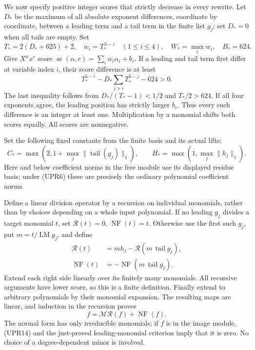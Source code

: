 We now specify positive integer scores that strictly decrease in
every rewrite.  Let \(D_*\) be the maximum of all absolute exponent
differences, coordinate by coordinate, between a leading term and
a tail term in the finite list \(g_j\); set \(D_*=0\) when all tails
are empty.  Set
\[
T_*=2(D_*+625)+2,\quad
w_i=T_*^{\,5-i}\quad(1\le i\le4),\quad
W_*=\max_i w_i,\quad B_*=624.
\tag{UPR11}
\]
Give \(X^\alpha x^r\) score
\(\operatorname{sc}(\alpha,r)=\sum_iw_i\alpha_i+b_r\).
If a leading and tail term first differ at variable index \(i\),
their score difference is at least
\[
T_*^{5-i}
-D_*\sum_{j>i}T_*^{5-j}-624>0.
\]
The last inequality follows from
\(D_*/(T_*-1)<1/2\) and \(T_*/2>624\).
If all four exponents agree, the leading position has strictly
larger \(b_r\).  Thus every such difference is an integer at least
one.  Multiplication by a monomial shifts both scores equally.
All scores are nonnegative.

Set the following fixed constants from the finite basis and its
actual lifts:
\[
C_*=\max\left(2,1+\max_j\|\operatorname{tail}(g_j)\|_1\right),
\qquad H_*=\max\left(1,\max_j\|h_j\|_1\right).
\tag{UPR12}
\]
Here and below coefficient norms in the free module use its
displayed residue basis; under (UPR6) these are precisely the
ordinary polynomial coefficient norms.

Define a linear division operator by a recursion on individual
monomials, rather than by choices depending on a whole input
polynomial.  If no leading \(g_j\) divides a target monomial \(t\),
set \(\mathcal R(t)=0\), \(\operatorname{NF}(t)=t\).
Otherwise use the first such \(g_j\), put \(m=t/\operatorname{LM}g_j\),
and define
\[
\begin{split}
\mathcal R(t)&=m h_j-\mathcal R(m\,\operatorname{tail}g_j),\\
\operatorname{NF}(t)&=-\operatorname{NF}
                         (m\,\operatorname{tail}g_j).
\end{split}
\tag{UPR13}
\]
Extend each right side linearly over its finitely many monomials.
All recursive arguments have lower score, so this is a finite
definition.  Finally extend to arbitrary polynomials by their
monomial expansion.  The resulting maps are linear, and induction
in the recursion proves
\[
f=\mathcal M\mathcal R(f)+\operatorname{NF}(f).
\tag{UPR14}
\]
The normal form has only irreducible monomials; if \(f\) is in
the image module, (UPR14) and the just-proved leading-monomial
criterion imply that it is zero.  No choice of a degree-dependent
minor is involved.

